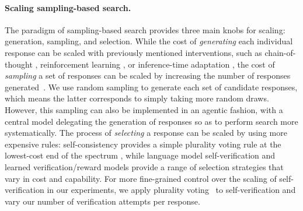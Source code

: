\paragraph{Scaling sampling-based search.}
The paradigm of sampling-based search provides three main knobs for scaling: generation, sampling, and selection.
While the cost of \emph{generating} each individual response can be scaled with previously mentioned interventions, such as chain-of-thought \citep[e.g.][]{DBLP:conf/nips/Wei0SBIXCLZ22}, reinforcement learning \citep[e.g.][]{o1-preview}, or inference-time adaptation \citep[e.g.][]{anil2024jailbreaking}, the cost of \emph{sampling} a set of responses can be scaled by increasing the number of responses generated~\citep{DBLP:conf/iclr/0002WSLCNCZ23,snell2024scalingllmtesttimecompute}.
We use random sampling to generate each set of candidate responses, which means the latter corresponds to simply taking more random draws.
However, this sampling can also be implemented in an agentic fashion, with a central model delegating the generation of responses so as to perform search more systematically.
The process of \emph{selecting} a response can be scaled by using more expensive rules: self-consistency provides a simple plurality voting rule at the lowest-cost end of the spectrum \citep{DBLP:conf/iclr/0002WSLCNCZ23}, while language model self-verification \citep[e.g.][see below]{xue_rcot_2023} and learned verification/reward models \citep[e.g.][see below]{cobbe_training_2021} provide a range of selection strategies that vary in cost and capability.
For more fine-grained control over the scaling of self-verification in our experiments, we apply plurality voting~\citep{DBLP:conf/iclr/0002WSLCNCZ23} to self-verification and vary our number of verification attempts per response.

